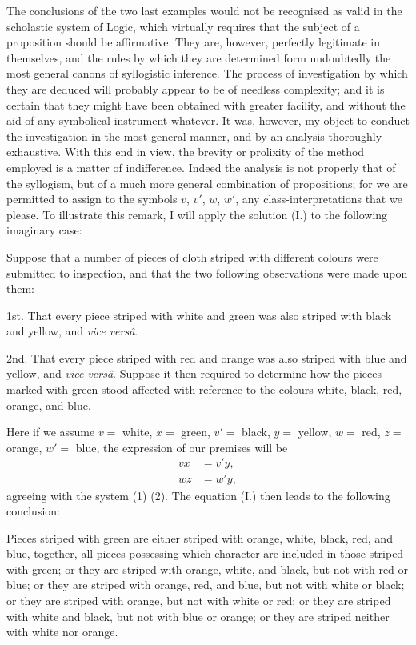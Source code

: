 \documentclass[oneside]{book}
\begin{document}
The conclusions of the two last examples would not be recognised as valid in the scholastic system of Logic, which virtually
requires that the subject of a proposition should be affirmative.
They are, however, perfectly legitimate in themselves, and the
rules by which they are determined form undoubtedly the most
general canons of syllogistic inference. The process of investigation by which they are deduced will probably appear to be of
needless complexity; and it is certain that they might have been
obtained with greater facility, and without the aid of any symbolical instrument whatever. It was, however, my object to
conduct the investigation in the most general manner, and by an
analysis thoroughly exhaustive. With this end in view, the
brevity or prolixity of the method employed is a matter of indifference.
Indeed the analysis is not properly that of the syllogism,
but of a much more general combination of propositions; for we
are permitted to assign to the symbols $v$, $v'$, $w$, $w'$, any class-interpretations
that we please. To illustrate this remark, I will
apply the solution (I.) to the following imaginary case:

Suppose that a number of pieces of cloth striped with different colours were submitted to inspection, and that the two following observations were made upon them:

1st. That every piece striped with white and green was also
striped with black and yellow, and \textit{vice vers\^{a}}.

2nd. That every piece striped with red and orange was also
striped with blue and yellow, and \textit{vice vers\^{a}}.
Suppose it then required to determine how the pieces marked
with green stood affected with reference to the colours white,
black, red, orange, and blue.

Here if we assume $v=$ white, $x =$ green, $v' =$ black, $y =$ yellow,
$w =$ red, $z =$ orange, $w' =$ blue, the expression of our premises will
be
\begin{align*}
  vx &= v'y,   \\
  wz &= w'y,
\end{align*}
agreeing with the system (1) (2). The equation (I.) then leads
to the following conclusion:

Pieces striped with green are either striped with orange,
white, black, red, and blue, together, all pieces possessing which
character are included in those striped with green; or they are
striped with orange, white, and black, but not with red or blue;
or they are striped with orange, red, and blue, but not with white
or black; or they are striped with orange, but not with white or
red; or they are striped with white and black, but not with blue
or orange; or they are striped neither with white nor orange.
\end{document}
